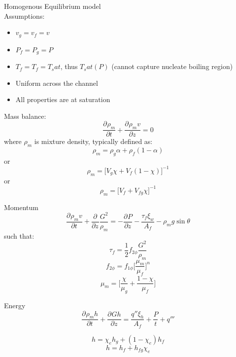 \documentclass{article}
\begin{document}
\newcommand{\pd}[3]{\frac{\partial^{#3}#1}{\partial {#2}^{#3}}}
Homogenous Equilibrium model\\
Assumptions:
\begin{itemize}
    \item $v_g = v_f = v$
    \item $P_f = P_g = P$
    \item $T_f = T_f = T_sat$, thus $T_sat(P)$ (cannot capture nucleate boiling region)
    \item Uniform across the channel
    \item All properties are at saturation
\end{itemize}
Mass balance:
\begin{equation}
    \pd{\rho_m}{t}{} + \pd{\rho_m v}{z}{} = 0
\end{equation}
where $\rho_m$ is mixture density, typically defined as:
\begin{equation}
    \rho_m = \rho_g\alpha + \rho_f(1-\alpha)
\end{equation}
or
\begin{equation}
    \rho_m = \biggr[V_g\chi + V_f(1-\chi)\biggr]^{-1}
\end{equation}
or \begin{equation}
    \rho_m = \biggr[ V_f + V_{fg}\chi \biggr]^{-1}
\end{equation}


Momentum
\begin{equation}
    \pd{\rho_mv}{t}{} + \pd{}{z}{}\frac{G^2}{\rho_m}= -\pd{P}{z}{} -\frac{\tau_f\xi_w}{A_f} - \rho_m g \sin\theta
\end{equation}
such that:
\begin{equation}
    \tau_f = \frac{1}{2}f_{2\phi}\frac{G^2}{\rho_m}
\end{equation}
\begin{equation}
    f_{2\phi} = f_{1\phi}\biggr[ \frac{\mu_m}{\mu_f}\biggr]^n
\end{equation}
\begin{equation}
    \mu_m = \biggr[ \frac{\chi}{\mu_g} + \frac{1-\chi}{\mu_f}\biggr]
\end{equation}


Energy
\begin{equation}
    \pd{\rho_mh}{t}{} + \pd{Gh}{z}{} = \frac{q''\xi_h}{A_f} + \frac{P}{t}+q'''
\end{equation}

\begin{equation}
    h = \chi_eh_g  + (1-\chi_e)h_f
\end{equation}
\begin{equation}
    h = h_f + h_{fg}\chi_e
\end{equation}
\end{document}
